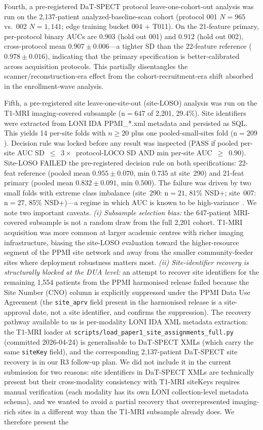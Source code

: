 \documentclass[10pt,letterpaper]{article}
\begin{document}
Fourth, a pre-registered DaT-SPECT protocol leave-one-cohort-out analysis was run on the 2,137-patient analyzed-baseline-scan cohort (protocol 001 $N{=}965$ vs.\ 002 $N{=}1{,}141$; edge training bucket 004 $+$ T011). On the 21-feature primary, per-protocol binary AUCs are $0.903$ (hold out 001) and $0.912$ (hold out 002), cross-protocol mean $0.907 \pm 0.006$---a tighter SD than the 22-feature reference ($0.978 \pm 0.016$), indicating that the primary specification is better-calibrated across acquisition protocols. This partially disentangles the scanner/reconstruction-era effect from the cohort-recruitment-era shift absorbed in the enrollment-wave analysis.

Fifth, a pre-registered site leave-one-site-out (site-LOSO) analysis was run on the T1-MRI imaging-covered subsample (n${=}647$ of 2{,}201, 29.4\%). Site identifiers were extracted from LONI IDA PPMI\_*.xml metadata and persisted as SQL. This yields 14 per-site folds with $n{\ge}20$ plus one pooled-small-sites fold (n${=}209$). Decision rule was locked before any result was inspected (PASS if pooled per-site AUC SD~${\le}$~$3{\times}$~protocol-LOCO SD AND min per-site AUC~${\ge}$~$0.90$). Site-LOSO FAILED the pre-registered decision rule on both specifications: 22-feat reference (pooled mean $0.955 \pm 0.070$, min $0.735$ at site~290) and 21-feat primary (pooled mean $0.832 \pm 0.091$, min $0.500$). The failure was driven by two small folds with extreme class imbalance (site~290: n${=}21$, 81\% NSD$+$; site~007: n${=}27$, 85\% NSD$+$)---a regime in which AUC is known to be high-variance~\cite{vovk2022}. We note two important caveats. \textit{(i) Subsample selection bias:} the 647-patient MRI-covered subsample is not a random draw from the full 2{,}201 cohort. T1-MRI acquisition was more common at larger academic centres with richer imaging infrastructure, biasing the site-LOSO evaluation toward the higher-resource segment of the PPMI site network and away from the smaller community-feeder sites where deployment robustness matters most. \textit{(ii) Site-identifier recovery is structurally blocked at the DUA level:} an attempt to recover site identifiers for the remaining 1{,}554 patients from the PPMI harmonised release failed because the Site Number (CNO) column is explicitly suppressed under the PPMI Data Use Agreement (the \texttt{site\_aprv} field present in the harmonised release is a site-approval date, not a site identifier, and confirms the suppression). The recovery pathway available to us is per-modality LONI IDA XML metadata extraction: the T1-MRI loader at \texttt{scripts/load\_paper1\_site\_assignments\_full.py} (committed 2026-04-24) is generalisable to DaT-SPECT XMLs (which carry the same \texttt{siteKey} field), and the corresponding 2{,}137-patient DaT-SPECT site recovery is in our R3 follow-up plan. We did not include it in the current submission for two reasons: site identifiers in DaT-SPECT XMLs are technically present but their cross-modality consistency with T1-MRI siteKeys requires manual verification (each modality has its own LONI collection-level metadata schema), and we wanted to avoid a partial recovery that overrepresented imaging-rich sites in a different way than the T1-MRI subsample already does. We therefore present the 
\end{document}
